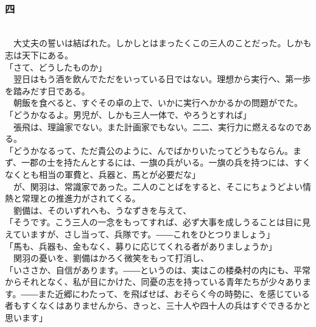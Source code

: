 \documentclass[
  paper=a5,
  fontsize=10pt,
  jafontsize=9.5pt,
  tate,                  %
  open_bracket_pos=nibu, %
]{jlreq}
\begin{document}
\\

\subsubsection{四}

\\


　大丈夫の誓いは結ばれた。しかしとはまったくこの三人のことだった。しかも志は天下にある。\\


「さて、どうしたものか」\\


　翌日はもう酒を飲んでただをいっている日ではない。理想から実行へ、第一歩を踏みだす日である。\\


　朝飯を食べると、すぐその卓の上で、いかに実行へかかるかの問題がでた。\\


「どうかなるよ。男児が、しかも三人一体で、やろうとすれば」\\


　張飛は、理論家でない。また計画家でもない。二二、実行力に燃えるなのである。\\


「どうかなるって、ただ貴公のように、んでばかりいたってどうもならん。まず、一郡の士を持たんとするには、一旗の兵がいる。一旗の兵を持つには、すくなくとも相当の軍費と、兵器と、馬とが必要だな」\\


　が、関羽は、常識家であった。二人のことばをすると、そこにちょうどよい情熱と常理との推進力がされてくる。\\


　劉備は、そのいずれへも、うなずきを与えて、\\


「そうです。こう三人の一念をもってすれば、必ず大事を成しうることは目に見えていますが、さし当って、兵隊です。――これをひとつりましょう」\\


「馬も、兵器も、金もなく、募りに応じてくれる者がありましょうか」\\


　関羽の憂いを、劉備はかろく微笑をもって打消し、\\


「いささか、自信があります。――というのは、実はこの楼桑村の内にも、平常からそれとなく、私が目にかけた、同憂の志を持っている青年たちが少々あります。――また近郷にわたって、を飛ばせば、おそらく今の時勢に、を感じている者もすくなくはありませんから、きっと、三十人や四十人の兵はすぐできるかと思います」\\
\end{document}
